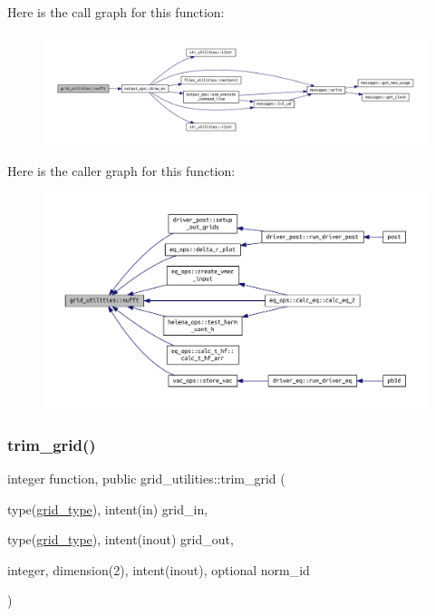 Here is the call graph for this function\+:
\nopagebreak
\begin{figure}[H]
\begin{center}
\leavevmode
\includegraphics[width=350pt]{namespacegrid__utilities_a0854b2d6cc61a31f68b4afe7304077a9_cgraph}
\end{center}
\end{figure}
Here is the caller graph for this function\+:
\nopagebreak
\begin{figure}[H]
\begin{center}
\leavevmode
\includegraphics[width=350pt]{namespacegrid__utilities_a0854b2d6cc61a31f68b4afe7304077a9_icgraph}
\end{center}
\end{figure}
\mbox{\label{namespacegrid__utilities_a67001ff9bbcad707aacf17f90a748d90}} 
\subsubsection{\texorpdfstring{trim\+\_\+grid()}{trim\_grid()}}
{\footnotesize\ttfamily integer function, public grid\+\_\+utilities\+::trim\+\_\+grid (\begin{DoxyParamCaption}\item[{type(\hyperlink{structgrid__vars_1_1grid__type}{grid\+\_\+type}), intent(in)}]{grid\+\_\+in,  }\item[{type(\hyperlink{structgrid__vars_1_1grid__type}{grid\+\_\+type}), intent(inout)}]{grid\+\_\+out,  }\item[{integer, dimension(2), intent(inout), optional}]{norm\+\_\+id }\end{DoxyParamCaption})}



